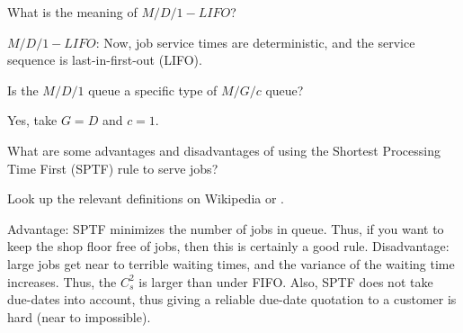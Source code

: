 \begin{exercise}[\faPhoto]
  What is the meaning of $M/D/1-LIFO$?
  \begin{solution}
 $M/D/1-LIFO$:  Now, job service times are deterministic, and the service sequence is last-in-first-out (LIFO).
  \end{solution}
\end{exercise}

\begin{exercise}[\faPhoto]
  Is the $M/D/1$ queue a specific type of  $M/G/c$ queue? 
  \begin{solution}
    Yes, take $G=D$ and $c=1$. 
  \end{solution}
\end{exercise}

\begin{exercise}[\faPhoto]
  What are some advantages and disadvantages of using the Shortest
  Processing Time First (SPTF) rule to serve jobs? 
  \begin{hint}
Look up the relevant
  definitions on Wikipedia or
  \citet{hall91:_queuein_method_servic_manuf}.
  \end{hint}
  \begin{solution}
    Advantage: SPTF minimizes the number of jobs in queue.
    Thus, if you want to keep the shop floor free of jobs, then this is certainly a good rule.
    Disadvantage: large jobs get near to terrible waiting times, and the variance of the waiting time increases.
    Thus, the $C_s^2$ is larger than under FIFO.
    Also, SPTF does not take due-dates into account, thus giving a reliable due-date quotation to a customer is hard (near to impossible).
  \end{solution}
\end{exercise}


